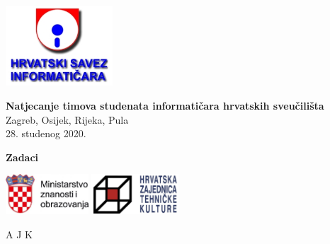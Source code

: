 \documentclass[a4paper]{article}
\begin{document}
\thispagestyle{empty}
\begin{center}
  \includegraphics[height=3cm]{pic/hsin.jpg}
\end{center}
\vspace{1cm}
\begin{center}
  {\Large\textbf{\textsf{Natjecanje timova studenata informatičara hrvatskih sveučilišta}}} \\
  \vspace{.5cm}
  {\large{\textsf{Zagreb, Osijek, Rijeka, Pula}}} \\
  \vspace{.3cm}
  \textsf{28. studenog 2020.}
\end{center}
\vspace{2cm}
\begin{center}
  {\large \textbf{Zadaci}}

  \begin{minipage}{.5\textwidth}
    \renewcommand\contentsname{}
    \tableofcontents
  \end{minipage}
\end{center}
\vspace{5cm}
\begin{center}
  \includegraphics[height=1.5cm]{pic/mzo.jpg}
  \hspace{3cm}
  \includegraphics[height=1.5cm]{pic/hztk.png}
\end{center}
\vspace{\fill}
\clearpage
\setcounter{page}{1}
{A}
{J}
{K}
\end{document}
